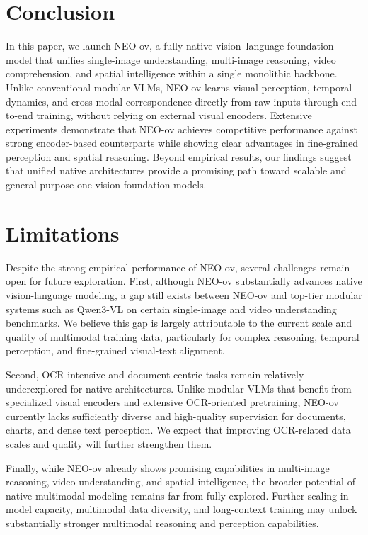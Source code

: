 \documentclass{llmxive}
\begin{document}
\section{Conclusion}

In this paper, we launch NEO-ov, a fully native vision–language foundation model that unifies single-image understanding, multi-image reasoning, video comprehension, and spatial intelligence within a single monolithic backbone. Unlike conventional modular VLMs, NEO-ov learns visual perception, temporal dynamics, and cross-modal correspondence directly from raw inputs through end-to-end training, without relying on external visual encoders.
%
Extensive experiments demonstrate that NEO-ov achieves competitive performance against strong encoder-based counterparts while showing clear advantages in fine-grained perception and spatial reasoning. Beyond empirical results, our findings suggest that unified native architectures provide a promising path toward scalable and general-purpose one-vision foundation models.

\section{Limitations}

Despite the strong empirical performance of NEO-ov, several challenges remain open for future exploration. First, although NEO-ov substantially advances native vision-language modeling, a gap still exists between NEO-ov and top-tier modular systems such as Qwen3-VL on certain single-image and video understanding benchmarks. We believe this gap is largely attributable to the current scale and quality of multimodal training data, particularly for complex reasoning, temporal perception, and fine-grained visual-text alignment.

Second, OCR-intensive and document-centric tasks remain relatively underexplored for native architectures. Unlike modular VLMs that benefit from specialized visual encoders and extensive OCR-oriented pretraining, NEO-ov currently lacks sufficiently diverse and high-quality supervision for documents, charts, and dense text perception. We expect that improving OCR-related data scales and quality will further strengthen them.

Finally, while NEO-ov already shows promising capabilities in multi-image reasoning, video understanding, and spatial intelligence, the broader potential of native multimodal modeling remains far from fully explored. Further scaling in model capacity, multimodal data diversity, and long-context training may unlock substantially stronger multimodal reasoning and perception capabilities.
\end{document}
